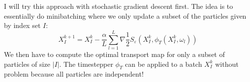 I will try this approach with stochastic gradient descent first. The idea is to essentially do minibatching where we only update a subset of the particles given by index set $I$:
\begin{equation}
    X_I^{k+1} = X_I^k - \frac{\alpha}{L} \sum_{l=1}^{L} \nabla \frac{1}{2} S_\varepsilon(X_I^k, \phi_T(X_I^k, \omega_l))
\end{equation}
We then have to compute the optimal transport map for only a subset of particles of size $|I|$. The timestepper $\phi_T$ can be applied to a batch $X_I^k$ without problem because all particles are independent!